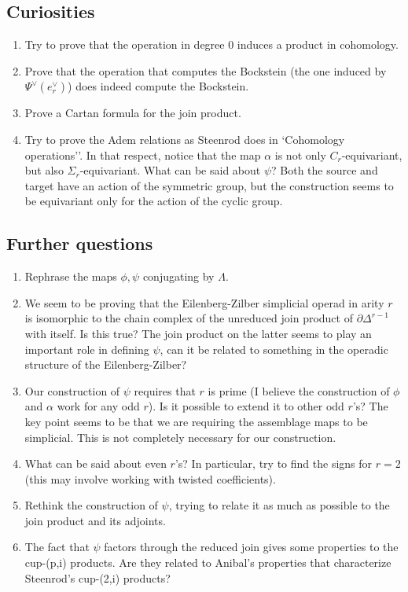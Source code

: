 \documentclass{report}
\begin{document}
	\subsection*{Curiosities}
	\begin{enumerate}
		\item Try to prove that the operation in degree $0$ induces a product in cohomology.
		\item Prove that the operation that computes the Bockstein (the one induced by $\Psi^\vee(e_r^\vee)$) does indeed compute the Bockstein.
		\item Prove a Cartan formula for the join product.
		\item Try to prove the Adem relations as Steenrod does in `Cohomology operations''. In that respect, notice that the map $\alpha$ is not only $C_r$-equivariant, but also $\Sigma_r$-equivariant. What can be said about $\psi$? Both the source and target have an action of the symmetric group, but the construction seems to be equivariant only for the action of the cyclic group.
	\end{enumerate}
	\subsection*{Further questions}
	\begin{enumerate}
		\item Rephrase the maps $\phi, \psi$ conjugating by $\Lambda$.
		\item We seem to be proving that the Eilenberg-Zilber simplicial operad in arity $r$ is isomorphic to the chain complex of the unreduced join product of $\partial \Delta^{r-1}$ with itself. Is this true? The join product on the latter seems to play an important role in defining $\psi$, can it be related to something in the operadic structure of the Eilenberg-Zilber?
		\item Our construction of $\psi$ requires that $r$ is prime (I believe the construction of $\phi$ and $\alpha$ work for any odd $r$). Is it possible to extend it to other odd $r$'s? The key point seems to be that we are requiring the assemblage maps to be simplicial. This is not completely necessary for our construction.
		\item What can be said about even $r$'s? In particular, try to find the signs for $r=2$ (this may involve working with twisted coefficients).
		\item Rethink the construction of $\psi$, trying to relate it as much as possible to the join product and its adjoints.
		\item The fact that $\psi$ factors through the reduced join gives some properties to the cup-(p,i) products. Are they related to Anibal's properties that characterize Steenrod's cup-(2,i) products? 
	\end{enumerate}
\end{document}

